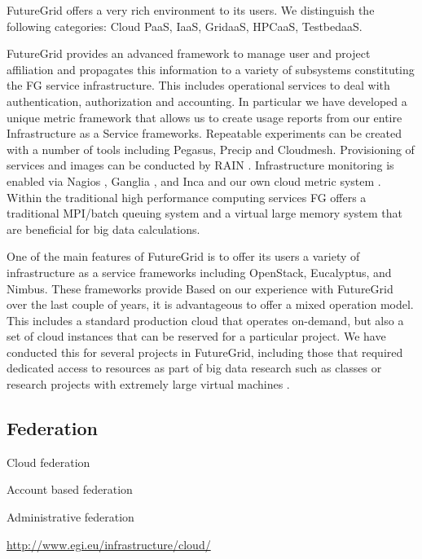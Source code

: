\documentclass{tex/sig-alternate-2013}
\begin{document}
FutureGrid offers a very rich environment to its users. We distinguish the following categories: Cloud PaaS, IaaS, GridaaS, HPCaaS, TestbedaaS.

FutureGrid provides an advanced framework to manage user and project affiliation and propagates this information to a variety of subsystems constituting the FG service infrastructure. This includes operational services to deal with authentication, authorization and accounting. In particular we have developed a unique metric framework that allows us to create usage reports from our entire Infrastructure as a Service frameworks. Repeatable experiments can be created with a number of tools including Pegasus, Precip and Cloudmesh. Provisioning of services and images can be conducted by RAIN \cite{imagemanagement,fg-1295}. Infrastructure monitoring is enabled via Nagios \cite{nagios}, Ganglia \cite{ganglia}, and Inca \cite{inca} and our own cloud metric system \cite{las08federated-cloud}.
Within the traditional high performance computing services FG offers a traditional MPI/batch queuing system and a virtual large memory system that are beneficial for big data calculations.


One of the main features of FutureGrid is to offer its users a variety of infrastructure as a service frameworks \cite{comparisoncloud,las2011virt} including OpenStack, Eucalyptus, and Nimbus. These frameworks provide Based on our experience with FutureGrid over the last couple of years, it is advantageous to offer a mixed operation model. This includes a standard production cloud that operates on-demand, but also a set of cloud instances that can be reserved for a particular project. We have conducted this for several projects in FutureGrid, including those that required dedicated access to resources as part of big data research such as classes \cite{fg405,fg368} or research projects with extremely large virtual machines \cite{fg298}.

\subsection{Federation}

Cloud federation

Account based federation

Administrative federation

\url{http://www.egi.eu/infrastructure/cloud/}


\cite{kurze2011cloudfederation}
\end{document}
